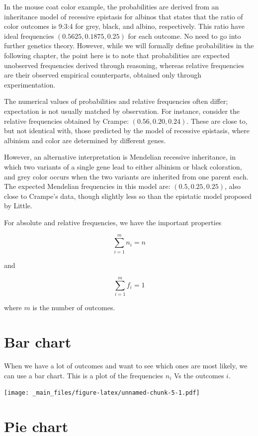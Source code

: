 \documentclass[
]{book}
\begin{document}
In the mouse coat color example, the probabilities are derived from an inheritance model of recessive epistasis for albinos that states that the ratio of color outcomes is 9:3:4 for grey, black, and albino, respectively. This ratio have ideal frequencies \((0.5625, 0.1875, 0.25)\) for each outcome. No need to go into further genetics theory. However, while we will formally define probabilities in the following chapter, the point here is to note that probabilities are expected unobserved frequencies derived through reasoning, whereas relative frequencies are their observed empirical counterparts, obtained only through experimentation.

The numerical values of probabilities and relative frequencies often differ; expectation is not usually matched by observation. For instance, consider the relative frequencies obtained by Crampe: \((0.56, 0.20, 0.24)\). These are close to, but not identical with, those predicted by the model of recessive epistasis, where albinism and color are determined by different genes.

However, an alternative interpretation is Mendelian recessive inheritance, in which two variants of a single gene lead to either albinism or black coloration, and grey color occurs when the two variants are inherited from one parent each. The expected Mendelian frequencies in this model are: \((0.5, 0.25, 0.25)\), also close to Crampe's data, though slightly less so than the epistatic model proposed by Little.

For absolute and relative frequencies, we have the important properties

\[\sum_{i=1}^m n_i = n\]

and

\[\sum_{i=1}^m f_i = 1\]

where \(m\) is the number of outcomes.

\hypertarget{bar-chart}{%
\section{Bar chart}\label{bar-chart}}

When we have a lot of outcomes and want to see which ones are most likely, we can use a bar chart. This is a plot of the frequencies \(n_i\) Vs the outcomes \(i\).

\texttt{[image: \_main\_files/figure-latex/unnamed-chunk-5-1.pdf]}

\hypertarget{pie-chart}{%
\section{Pie chart}\label{pie-chart}}
\end{document}
